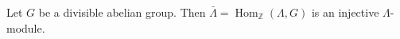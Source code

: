 Let $G$ be a divisible abelian group. Then $\bar{\Lambda} = \operatorname{Hom}_{\mathbb{Z}}(\Lambda, G)$ is an injective $\Lambda$-module.
